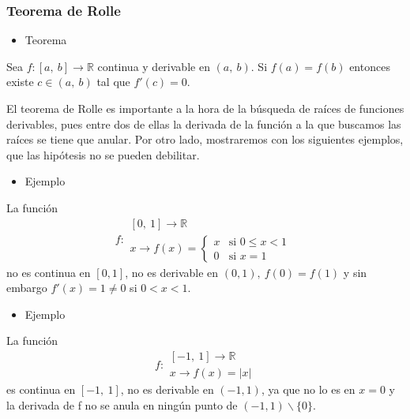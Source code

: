 \subsubsection{Teorema de Rolle}
\begin{itemize}[label=\color{red}\textbullet, leftmargin=*]
	\item \color{lightblue}Teorema
\end{itemize}
Sea $f:[a,~b]\rightarrow\mathbb{R}$ continua y derivable en $(a,~b)$. Si $f(a)=f(b)$ entonces existe $c\in(a,~b)$ tal que $f'(c)=0$.

El teorema de Rolle es importante a la hora de la búsqueda de raíces de funciones derivables, pues entre dos de ellas la derivada de la función a la que buscamos las raíces se tiene que anular. Por otro lado, mostraremos con los siguientes ejemplos, que las hipótesis no se pueden debilitar.
\begin{itemize}[label=\color{red}\textbullet, leftmargin=*]
	\item \color{lightblue}Ejemplo
\end{itemize}
La función \[ f:\begin{array}{c}
	[0,~1]\rightarrow\mathbb{R}\\
	x\rightarrow f(x)=\left\lbrace\begin{array}{ll}
		x & \text{si }0\le x<1\\
		0 & \text{si } x=1
	\end{array}\right.
\end{array} \] no es continua en $[0,1]$, no es derivable en $(0,1),~f(0)=f(1)$ y sin embargo $f'(x)=1\neq0$ si $0<x<1$.
\begin{itemize}[label=\color{red}\textbullet, leftmargin=*]
	\item \color{lightblue}Ejemplo
\end{itemize}
La función \[ f:\begin{array}{c}
	[-1,~1]\rightarrow\mathbb{R}\\
	x\rightarrow f(x)=|x|
\end{array} \] es continua en $[-1,~1]$, no es derivable en $(-1,1)$, ya que no lo es en $x=0$ y la derivada de f no se anula en ningún punto de $(-1,1)\backslash\{0\}$.
